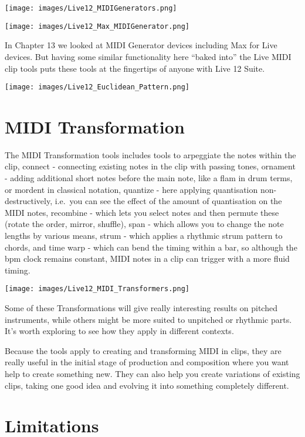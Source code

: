 \documentclass[
  12pt,
  letterpaper,
  oneside,
  open=any]{scrbook}
\begin{document}
\texttt{[image: images/Live12\_MIDIGenerators.png]}

\texttt{[image: images/Live12\_Max\_MIDIGenerator.png]}

In Chapter 13 we looked at MIDI Generator devices including Max for Live
devices. But having some similar functionality here ``baked into'' the
Live MIDI clip tools puts these tools at the fingertips of anyone with
Live 12 Suite.

\texttt{[image: images/Live12\_Euclidean\_Pattern.png]}

\section{MIDI Transformation}\label{midi-transformation-1}

The MIDI Transformation tools includes tools to arpeggiate the notes
within the clip, connect - connecting existing notes in the clip with
passing tones, ornament - adding additional short notes before the main
note, like a flam in drum terms, or mordent in classical notation,
quantize - here applying quantisation non-destructively, i.e.~you can
see the effect of the amount of quantisation on the MIDI notes,
recombine - which lets you select notes and then permute these (rotate
the order, mirror, shuffle), span - which allows you to change the note
lengths by various means, strum - which applies a rhythmic strum pattern
to chords, and time warp - which can bend the timing within a bar, so
although the bpm clock remains constant, MIDI notes in a clip can
trigger with a more fluid timing.

\texttt{[image: images/Live12\_MIDI\_Transformers.png]}

Some of these Transformations will give really interesting results on
pitched instruments, while others might be more suited to unpitched or
rhythmic parts. It's worth exploring to see how they apply in different
contexts.

Because the tools apply to creating and transforming MIDI in clips, they
are really useful in the initial stage of production and composition
where you want help to create something new. They can also help you
create variations of existing clips, taking one good idea and evolving
it into something completely different.

\section{Limitations}\label{limitations}
\end{document}
